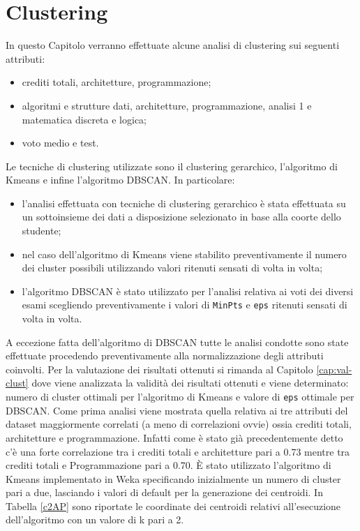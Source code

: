 \documentclass[12pt]{article}
\begin{document}
\section{Clustering}
\label{cap:clust}
In questo Capitolo verranno effettuate alcune analisi di clustering sui se\-guenti attributi:
\begin{itemize}
\item crediti totali, architetture, programmazione;
\item algoritmi e strutture dati, architetture, programmazione, analisi 1 e matematica discreta e logica;
\item voto medio e test.
\end{itemize}
Le tecniche di clustering utilizzate sono il clustering gerarchico, l'algori\-tmo di Kmeans e infine l'algoritmo DBSCAN. In particolare:
\begin{itemize}
\item l'analisi effettuata con tecniche di clustering gerarchico è stata effet\-tuata su un sottoinsieme dei dati a disposizione selezionato in base alla coorte dello studente;
\item nel caso dell'algoritmo di Kmeans viene stabilito preventivamente il numero dei cluster possibili utilizzando valori ritenuti sensati di volta in volta;
\item l'algoritmo DBSCAN è stato utilizzato per l'analisi relativa ai voti dei diversi esami scegliendo preventivamente i valori di \texttt{MinPts} e \texttt{eps} ritenuti sensati di volta in volta.
\end{itemize}
A eccezione fatta dell'algoritmo di DBSCAN tutte le analisi condotte sono state effettuate procedendo preventivamente alla normalizzazione degli attributi coinvolti. 
Per la valutazione dei risultati ottenuti si rimanda al Capitolo \ref{cap:val-clust} dove viene analizzata la validità dei risultati ottenuti e viene determinato: 
numero di cluster ottimali per l'algoritmo di Kmeans e valo\-re di \texttt{eps} ottimale per DBSCAN.
Come prima analisi viene mostrata quella relativa ai tre attributi del dataset maggiormente correlati (a meno di 
correlazioni ovvie) ossia crediti totali, architetture e programmazione.
Infatti come è stato già precedentemente detto c'è una forte correlazione tra i crediti totali e architetture pari a 0.73 mentre tra crediti totali e Programmazione pari a 0.70.
È stato utilizzato l'algoritmo di Kmeans implementato in Weka specificando inizialmente un numero di cluster pari a due, lasciando i valori di default per la generazione dei centroidi.
In Tabella \ref{c2AP} sono riporta\-te le coordinate dei centroidi relativi all'esecuzione dell'algoritmo con un valore di k pari a 2.
\end{document}

